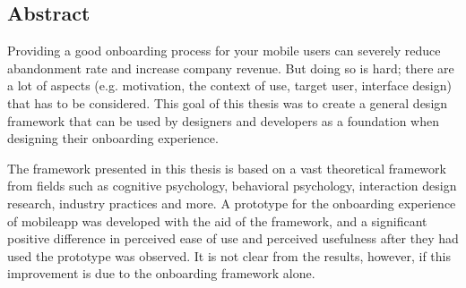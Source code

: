 \begin{center}
\section*{Abstract}

Providing a good onboarding process for your mobile users can severely reduce abandonment rate and increase company revenue. But doing so is hard; there are a lot of aspects (e.g. motivation, the context of use, target user, interface design) that has to be considered. This goal of this thesis was to create a general design framework that can be used by designers and developers as a foundation when designing their onboarding experience.

The framework presented in this thesis is based on a vast theoretical framework from fields such as cognitive psychology, behavioral psychology, interaction design research, industry practices and more. A prototype for the onboarding experience of mobileapp was developed with the aid of the framework, and a significant positive difference in perceived ease of use and perceived usefulness after they had used the prototype was observed. It is not clear from the results, however, if this improvement is due to the onboarding framework alone.

\end{center}
